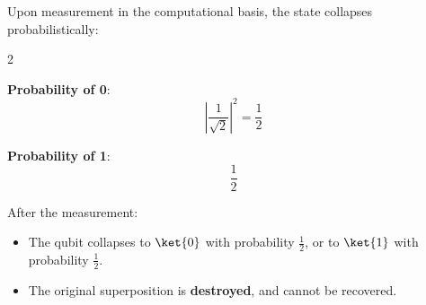 \highspace
Upon measurement in the computational basis, the state collapses probabilistically:
\begin{itemize}
    \begin{multicols}{2}
        \item \textbf{Probability of 0}:
        \begin{equation*}
            \left|\dfrac{1}{\sqrt{2}}\right|^{2} = \dfrac{1}{2}
        \end{equation*}
        \item \textbf{Probability of 1}:
        \begin{equation*}
            \dfrac{1}{2}
        \end{equation*}
    \end{multicols}
\end{itemize}
After the measurement:
\begin{itemize}
    \item The qubit collapses to $\ket{0}$ with probability $\frac{1}{2}$, or to $\ket{1}$ with probability $\frac{1}{2}$.
    \item The original superposition is \textbf{destroyed}, and cannot be recovered.
\end{itemize}

\newpage

